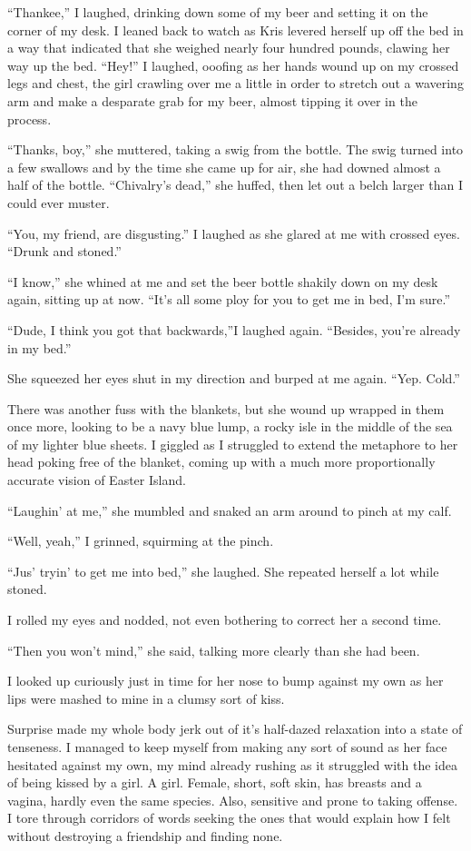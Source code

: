 ``Thankee,'' I laughed, drinking down some of my beer and setting it on the corner of my desk.  I leaned back to watch as Kris levered herself up off the bed in a way that indicated that she weighed nearly four hundred pounds, clawing her way up the bed.  ``Hey!'' I laughed, ooofing as her hands wound up on my crossed legs and chest, the girl crawling over me a little in order to stretch out a wavering arm and make a desparate grab for my beer, almost tipping it over in the process.

``Thanks, boy,'' she muttered, taking a swig from the bottle.  The swig turned into a few swallows and by the time she came up for air, she had downed almost a half of the bottle.  ``Chivalry's dead,'' she huffed, then let out a belch larger than I could ever muster.

``You, my friend, are disgusting.''  I laughed as she glared at me with crossed eyes.  ``Drunk and stoned.''

``I know,'' she whined at me and set the beer bottle shakily down on my desk again, sitting up at now.  ``It's all some ploy for you to get me in bed, I'm sure.''

``Dude, I think you got that backwards,''I laughed again.  ``Besides, you're already in my bed.''

She squeezed her eyes shut in my direction and burped at me again.  ``Yep.  Cold.''

There was another fuss with the blankets, but she wound up wrapped in them once more, looking to be a navy blue lump, a rocky isle in the middle of the sea of my lighter blue sheets.  I giggled as I struggled to extend the metaphore to her head poking free of the blanket, coming up with a much more proportionally accurate vision of Easter Island.

``Laughin' at me,'' she mumbled and snaked an arm around to pinch at my calf.

``Well, yeah,'' I grinned, squirming at the pinch.

``Jus' tryin' to get me into bed,'' she laughed.  She repeated herself a lot while stoned.

I rolled my eyes and nodded, not even bothering to correct her a second time.

``Then you won't mind,'' she said, talking more clearly than she had been.

I looked up curiously just in time for her nose to bump against my own as her lips were mashed to mine in a clumsy sort of kiss.

Surprise made my whole body jerk out of it's half-dazed relaxation into a state of tenseness.  I managed to keep myself from making any sort of sound as her face hesitated against my own, my mind already rushing as it struggled with the idea of being kissed by a girl.  A girl.  Female, short, soft skin, has breasts and a vagina, hardly even the same species.  Also, sensitive and prone to taking offense.  I tore through corridors of words seeking the ones that would explain how I felt without destroying a friendship and finding none.

